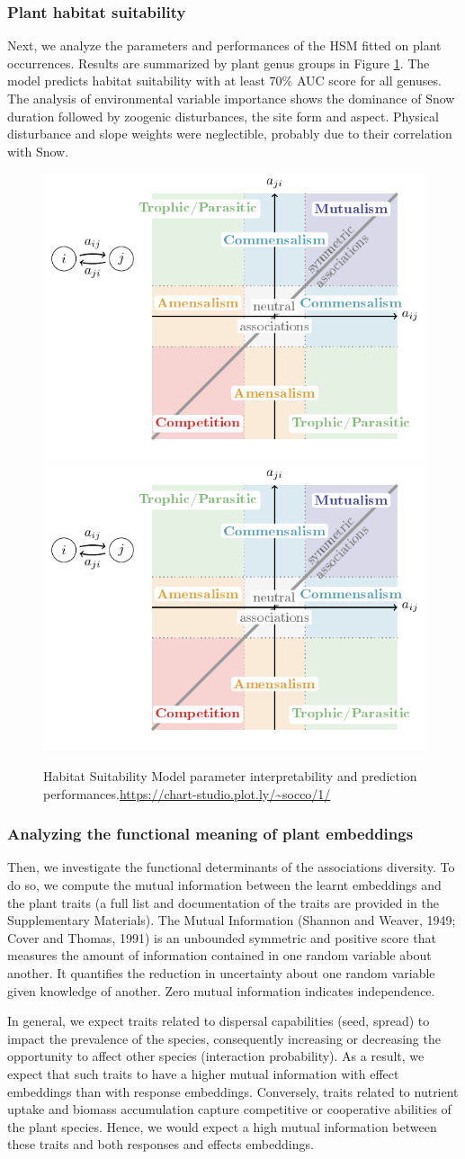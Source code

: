 \documentclass[10pt,a4paper]{article}
\newcommand{\inclPlt}[2]{\includegraphics[page=#1]{tikz_figures.pdf}}
\begin{document}
\subsubsection{Plant habitat suitability}
Next, we analyze the parameters and performances of the HSM fitted on plant occurrences. Results are summarized by plant genus groups in Figure \ref{hsmaravo}. The model predicts habitat suitability with at least $70\%$ AUC score for all genuses. The analysis of environmental variable importance shows the dominance of Snow duration followed by zoogenic disturbances, the site form and aspect. Physical disturbance and slope weights were neglectible, probably due to their correlation with Snow. 

\begin{figure}[bthp]
  \centering
  \inclPlt{7}{box_AlpsHSMw}
  \inclPlt{8}{scatter_AlpsPlantScores}
  \caption{Habitat Suitability Model parameter interpretability and prediction performances.\url{https://chart-studio.plot.ly/~socco/1/}}
  \label{hsmaravo}
\end{figure}


\subsubsection{Analyzing the functional meaning of plant embeddings}
Then, we investigate the functional determinants of the associations diversity. To do so, we compute the mutual information between the learnt embeddings and the plant traits (a full list and documentation of the traits are provided in the Supplementary Materials). The Mutual Information (Shannon and Weaver, 1949; Cover and Thomas, 1991) is an unbounded symmetric and positive score that measures the amount of information contained in one random variable about another. It quantifies the reduction in uncertainty about one random variable given knowledge of another. Zero mutual information indicates independence. 

In general, we expect traits related to dispersal capabilities (seed, spread) to impact the prevalence of the species, consequently increasing or decreasing the opportunity to affect other species (interaction probability). As a result, we expect that such traits to have a higher mutual information with effect embeddings than with response embeddings. Conversely, traits related to nutrient uptake and biomass accumulation capture competitive or cooperative abilities of the plant species. Hence, we would expect a high mutual information between these traits and both responses and effects embeddings.
\end{document}
